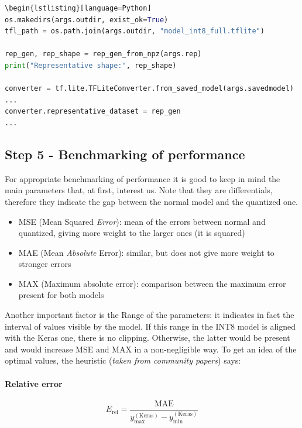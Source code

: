 \begin{lstlisting}[language=Python]
\begin{lstlisting}[language=Python]
os.makedirs(args.outdir, exist_ok=True)
tfl_path = os.path.join(args.outdir, "model_int8_full.tflite")

rep_gen, rep_shape = rep_gen_from_npz(args.rep)
print("Representative shape:", rep_shape)

converter = tf.lite.TFLiteConverter.from_saved_model(args.savedmodel)
...
converter.representative_dataset = rep_gen
...

\end{lstlisting}

\subsection{Step 5 - Benchmarking of performance}

For appropriate benchmarking of performance it is good to keep in mind the main parameters that, at first, interest us. Note that they are differentials, therefore they indicate the gap between the normal model and the quantized one.

\begin{itemize}
    \item MSE (Mean Squared \textit{Error}): mean of the errors between normal and quantized, giving more weight to the larger ones (it is squared)
    \item MAE (Mean \textit{Absolute} Error): similar, but does not give more weight to stronger errors
    \item MAX (Maximum absolute error): comparison between the maximum error present for both models
\end{itemize}

Another important factor is the Range of the parameters: it indicates in fact the interval of values visible by the model. If this range in the INT8 model is aligned with the Keras one, there is no clipping. Otherwise, the latter would be present and would increase MSE and MAX in a non-negligible way.
To get an idea of the optimal values, the heuristic (\textit{taken from community papers}) says:

\paragraph{Relative error}
\begin{equation}
E_{\mathrm{rel}} = \frac{\mathrm{MAE}}{y_{\max}^{(\mathrm{Keras})} - y_{\min}^{(\mathrm{Keras})}}
\end{equation}

